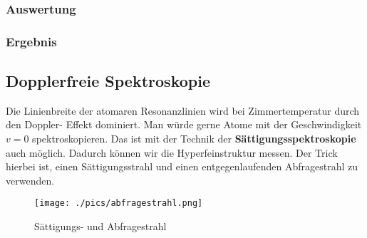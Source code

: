\documentclass[a4paper,oneside]{article}
\begin{document}
\subsubsection{Auswertung}
\subsubsection{Ergebnis}

\subsection{Dopplerfreie Spektroskopie}
Die Linienbreite der atomaren Resonanzlinien wird bei Zimmertemperatur durch den Doppler- Effekt dominiert. Man würde gerne Atome mit der Geschwindigkeit $v=0$ spektroskopieren. Das ist mit der Technik der \textbf{Sättigungsspektroskopie} auch möglich. Dadurch können wir die Hyperfeinstruktur messen. Der Trick hierbei ist, einen Sättigungsstrahl und einen entgegenlaufenden Abfragestrahl zu verwenden.\begin{figure}
 \centering
 \texttt{[image: ./pics/abfragestrahl.png]}
 \caption{Sättigungs- und Abfragestrahl}
\end{figure}
\end{document}
